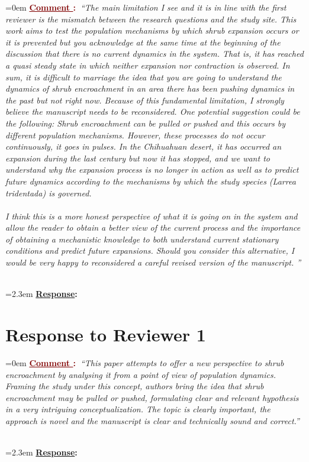 \documentclass[12pt]{article}
\newcounter{cN}
\newcommand{\comment}[1]{
	\vspace{2em}
	\refstepcounter{cN} %
	\noindent \hangindent=0em \textbf{\textcolor{Maroon}{\uline{Comment \thecN}:~}}\emph{``#1''}
	}
\newcommand{\response}[1]{
	\\[0.25em]
	\hangindent=2.3em \textbf{\textcolor{NavyBlue}{\uline{Response}:~}}#1
	}
\begin{document}
\comment{The main limitation I see and it is in line with the first reviewer is the mismatch between the research questions and the study site. This work aims to test the population mechanisms by which shrub expansion occurs or it is prevented but you acknowledge at the same time at the beginning of the discussion that there is no current dynamics in the system. That is, it has reached a quasi steady state in which neither expansion nor contraction is observed. In sum, it is difficult to marriage the idea that you are going to understand the dynamics of shrub encroachment in an area there has been pushing dynamics in the past but not right now. Because of this fundamental limitation, I strongly believe the manuscript needs to be reconsidered. One potential suggestion could be the following: Shrub encroachment can be pulled or pushed and this occurs by different population mechanisms. However, these processes do not occur continuously, it goes in pulses. In the Chihuahuan desert, it has occurred an expansion during the last century but now it has stopped, and we want to understand why the expansion process is no longer in action as well as to predict future dynamics according to the mechanisms by which the study species (Larrea tridentada) is governed. 
\\
\\
I think this is a more honest perspective of what it is going on in the system and allow the reader to obtain a better view of the current process and the importance of obtaining a mechanistic knowledge to both understand current stationary conditions and predict future expansions. Should you consider this alternative, I would be very happy to reconsidered a careful revised version of the manuscript.  
}
\response{}

\section{Response to Reviewer 1}
\vspace{-2em}

\comment{This paper attempts to offer a new perspective to shrub encroachment by analysing it from a point of view of population dynamics. Framing the study under this concept, authors bring the  idea that shrub encroachment may be pulled or pushed, formulating clear and relevant hypothesis in a very intriguing conceptualization. The topic is clearly important, the approach is novel and the manuscript is clear and technically sound and correct.}
\response{}
\end{document}

